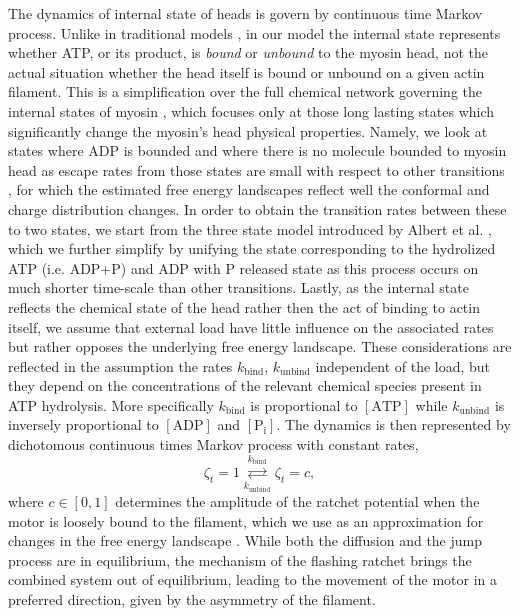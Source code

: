 \documentclass[aps,pre,twocolumn,showpacs,showkeys]{revtex4-1}
\begin{document}
The dynamics of internal state of heads is govern by continuous time Markov process. 
Unlike in traditional models \cite{}, %
in our model the internal state represents whether ATP, or its product, is \emph{bound} or \emph{unbound} to the myosin head,
not the actual situation whether the head itself is bound or unbound on a given actin filament.
This is a simplification over the full chemical network governing the internal states of myosin \cite{Bierbaum2011,Bierbaum2013},  
which focuses only at those long lasting states which significantly change the myosin's head physical properties.
Namely, we look at states where ADP is bounded and where there is no molecule bounded to myosin head as escape rates from those states are small with respect to other transitions \cite{Bierbaum2011}, 
for which the estimated free energy landscapes \cite{Nie2014,nie2014conformational} reflect well the conformal and charge distribution changes.
In order to obtain the transition rates between these to two states, we start from the three state model introduced by Albert et al. \cite{albert2014stochastic},
which we further simplify by unifying the state corresponding to the hydrolized ATP (i.e. ADP+P) and ADP with P released state as this process occurs on much shorter time-scale than other transitions.
Lastly, as the internal state reflects the chemical state of the head rather then the act of binding to actin itself,
we assume that external load have little influence on the associated rates but rather opposes the underlying free energy landscape. 
These considerations are reflected in the assumption the rates $k_\text{bind}$, $k_\text{unbind}$ independent of the load, 
but they depend on the concentrations of the relevant chemical species present in ATP hydrolysis. 
More specifically $k_\text{bind}$ is proportional to $[\text{ATP}]$ while $k_\text{unbind}$ is inversely proportional to $[\text{ADP}]$ and $[\text{P}_\text{i}]$.
The dynamics is then represented by dichotomous continuous times Markov process with constant rates,
\begin{equation}
\zeta_t = 1 \overset{k_\text{bind}}{\underset{k_\text{unbind}}{\rightleftarrows}} \zeta_t = c ,
\label{eq:transition}
\end{equation}
where $c\in\left[0,1\right]$ determines the amplitude of the ratchet potential when the motor is loosely bound to the filament, 
which we use as an approximation for changes in the free energy landscape \cite{Nie2014,nie2014conformational}.
While both the diffusion and the jump process are in equilibrium, the mechanism of the flashing ratchet brings the combined system out of equilibrium, leading to the movement of the motor in a preferred direction, given by the asymmetry of the filament. 
\end{document}
